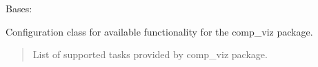 \documentclass[letterpaper,10pt,english]{sphinxmanual}
\begin{document}
\begin{fulllineitems}
\label{\detokenize{comp_viz:comp_viz.config.Models}}
\pysigstartsignatures
{}
\pysigstopsignatures
\sphinxAtStartPar
Bases: {\hyperref[\detokenize{comp_viz:comp_viz.config.CompViz}]{}}

\sphinxAtStartPar
Configuration class for available functionality for the comp\_viz package.
\begin{quote}\begin{description}
\sphinxAtStartPar
{} \textendash{} List of supported tasks provided by comp\_viz package.

\end{description}\end{quote}

\begin{fulllineitems}
\label{\detokenize{comp_viz:comp_viz.config.Models.tasks}}
\pysigstartsignatures
{}
\pysigstopsignatures
\end{fulllineitems}


\end{fulllineitems}

\end{document}
